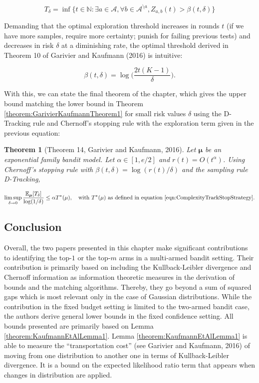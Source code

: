 \documentclass[11pt,]{article}
\newtheorem{theorem}{Theorem}
\begin{document}
\begin{equation*}
T_{\delta} = \inf \{t \in \mathbb{N}: \exists a \in \mathcal{A}, \forall b\in \mathcal{A}^{\setminus a}, Z_{a,b}(t) > \beta(t, \delta)\}
\end{equation*}

Demanding that the optimal exploration threshold increases in rounds
\(t\) (if we have more samples, require more certainty; punish for
failing previous tests) and decreases in risk \(\delta\) at a
diminishing rate, the optimal threshold derived in Theorem 10 of
Garivier and Kaufmann (2016) is intuitive:

\begin{equation*}
\beta(t, \delta) = \log \Big(\frac{2t(K-1)}{\delta}\Big).
\end{equation*}

With this, we can state the final theorem of the chapter, which gives
the upper bound matching the lower bound in Theorem
\ref{theorem:GarivierKaufmannTheorem1} for small risk values \(\delta\)
using the D-Tracking rule and Chernoff's stopping rule with the
exploration term given in the previous equation:

\begin{theorem}[Theorem 14, Garivier and Kaufmann, 2016] \label{theorem:GarivierAndKaufmannTheorem14}
Let $\bm{\mu}$ be an exponential family bandit model. Let $\alpha \in [1, e/2]$ and $r(t) = O(t^{\alpha})$. Using Chernoff's stopping rule with $\beta(t,\delta) = \log(r(t)/\delta)$ and the sampling rule D-Tracking,

\begin{equation*}
\limsup_{\delta \to 0} \frac{\mathbb{E}_{\bm{\mu}}[T_{\delta}]}{\log(1/\delta)} \leq \alpha T^*(\mu), \quad \text{with } T^*(\mu) \text{ as defined in equation \ref{eqn:ComplexityTrackStopStrategy}}.
\end{equation*}
\end{theorem}

\subsection{Conclusion}\label{conclusion}

Overall, the two papers presented in this chapter make significant
contributions to identifying the top-\(1\) or the top-\(m\) arms in a
multi-armed bandit setting. Their contribution is primarily based on
including the Kullback-Leibler divergence and Chernoff information as
information theoretic measures in the derivation of bounds and the
matching algorithms. Thereby, they go beyond a sum of squared gaps which
is most relevant only in the case of Gaussian distributions. While the
contribution in the fixed budget setting is limited to the two-armed
bandit case, the authors derive general lower bounds in the fixed
confidence setting. All bounds presented are primarily based on Lemma
\ref{theorem:KaufmannEtAlLemma1}. Lemma \ref{theorem:KaufmannEtAlLemma1}
is able to measure the ``transportation cost'' (see Garivier and
Kaufmann, 2016) of moving from one distribution to another one in terms
of Kullback-Leibler divergence. It is a bound on the expected likelihood
ratio term that appears when changes in distribution are applied.
\end{document}
